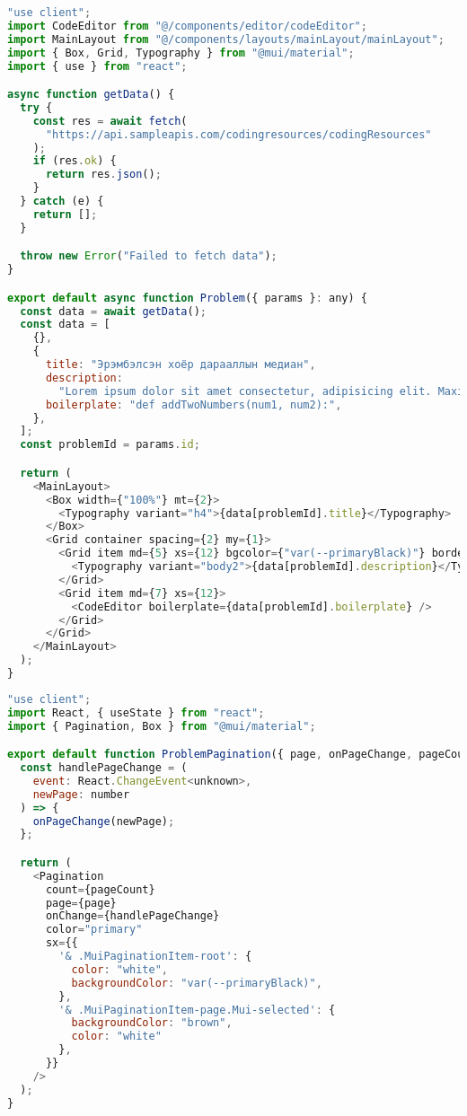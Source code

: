 \begin{lstlisting}[language=JavaScript, frame=single, caption={Хэрэглэгчийн компонент дээр дата render хийж буй байдал}]
"use client";
import CodeEditor from "@/components/editor/codeEditor";
import MainLayout from "@/components/layouts/mainLayout/mainLayout";
import { Box, Grid, Typography } from "@mui/material";
import { use } from "react";

async function getData() {
  try {
    const res = await fetch(
      "https://api.sampleapis.com/codingresources/codingResources"
    );
    if (res.ok) {
      return res.json();
    }
  } catch (e) {
    return [];
  }

  throw new Error("Failed to fetch data");
}

export default async function Problem({ params }: any) {
  const data = await getData();
  const data = [
    {},
    {
      title: "Эрэмбэлсэн хоёр дарааллын медиан",
      description:
        "Lorem ipsum dolor sit amet consectetur, adipisicing elit. Maxime et, aperiam accusamus quisquam odio laborum ipsa vero atque saepe tempora earum iste sapiente? Blanditiis quas quasi, unde aliquam nam alias!",
      boilerplate: "def addTwoNumbers(num1, num2):",
    },
  ];
  const problemId = params.id;

  return (
    <MainLayout>
      <Box width={"100%"} mt={2}>
        <Typography variant="h4">{data[problemId].title}</Typography>
      </Box>
      <Grid container spacing={2} my={1}>
        <Grid item md={5} xs={12} bgcolor={"var(--primaryBlack)"} borderRadius={"20px"}>
          <Typography variant="body2">{data[problemId].description}</Typography>
        </Grid>
        <Grid item md={7} xs={12}>
          <CodeEditor boilerplate={data[problemId].boilerplate} />
        </Grid>
      </Grid>
    </MainLayout>
  );
}

\end{lstlisting}

\begin{lstlisting}[language=JavaScript, frame=single, caption={MUI ашиглаж pagination хийж буй жишээ}]
"use client";
import React, { useState } from "react";
import { Pagination, Box } from "@mui/material";

export default function ProblemPagination({ page, onPageChange, pageCount }: any) {
  const handlePageChange = (
    event: React.ChangeEvent<unknown>,
    newPage: number
  ) => {
    onPageChange(newPage);
  };

  return (
    <Pagination
      count={pageCount}
      page={page}
      onChange={handlePageChange}
      color="primary"
      sx={{
        '& .MuiPaginationItem-root': {
          color: "white",
          backgroundColor: "var(--primaryBlack)",
        },
        '& .MuiPaginationItem-page.Mui-selected': {
          backgroundColor: "brown",
          color: "white"
        },
      }}
    />
  );
}

\end{lstlisting}


